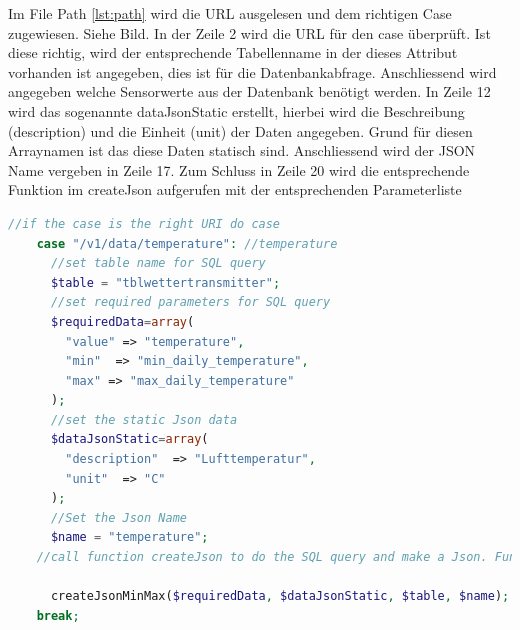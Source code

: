 Im File Path \ref{lst:path} wird die URL ausgelesen und dem richtigen Case zugewiesen. Siehe Bild. In der Zeile 2 wird die URL für den case überprüft. Ist diese richtig, wird der entsprechende Tabellenname in der dieses Attribut vorhanden ist angegeben, dies ist für die Datenbankabfrage. Anschliessend wird angegeben welche Sensorwerte aus der Datenbank benötigt werden. In Zeile 12 wird das sogenannte dataJsonStatic erstellt, hierbei wird die Beschreibung (description) und die Einheit (unit) der Daten angegeben. Grund für diesen Arraynamen ist das diese Daten statisch sind. Anschliessend wird der JSON Name vergeben in Zeile 17. Zum Schluss in Zeile 20 wird die entsprechende Funktion im createJson aufgerufen mit der entsprechenden Parameterliste

\begin{lstlisting}[label=lst:path,caption=Beispiel Case zuweisung, language=php, style=php]
  //if the case is the right URI do case
    case "/v1/data/temperature": //temperature
      //set table name for SQL query
      $table = "tblwettertransmitter";
      //set required parameters for SQL query
      $requiredData=array(
        "value" => "temperature",
        "min"  => "min_daily_temperature",
        "max" => "max_daily_temperature"
      );
      //set the static Json data
      $dataJsonStatic=array(
        "description"  => "Lufttemperatur",
        "unit"  => "C"
      );
      //Set the Json Name
      $name = "temperature";
    //call function createJson to do the SQL query and make a Json. Function is in file createJson.php

      createJsonMinMax($requiredData, $dataJsonStatic, $table, $name);
    break;
\end{lstlisting}

